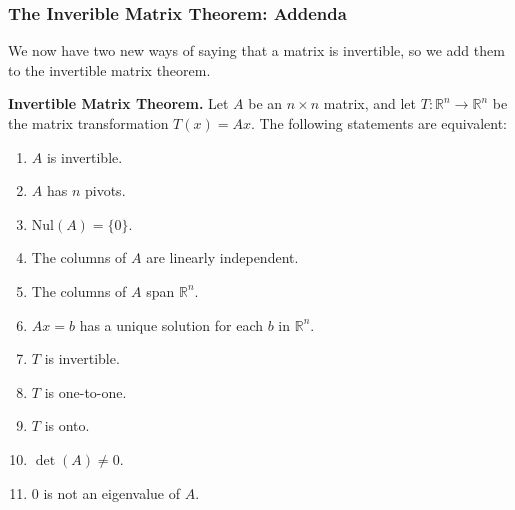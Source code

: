 \documentclass[a4paper,12pt]{article}
\begin{document}
\small \subsubsection{The Inverible Matrix Theorem: Addenda}
\begin{frame}
    \small

    \small We now have two new ways of saying that a matrix is invertible, so we add them to the invertible matrix theorem.

\textbf{Invertible Matrix Theorem.} Let \( A \) be an \( n \times n \) matrix, and let \( T: \mathbb{R}^n \to \mathbb{R}^n \) be the matrix transformation \( T(x) = Ax \). The following statements are equivalent:

\begin{enumerate}
    \item \( A \) is invertible.
    \item \( A \) has \( n \) pivots.
    \item \( \text{Nul}(A) = \{0\} \).
    \item The columns of \( A \) are linearly independent.
    \item The columns of \( A \) span \( \mathbb{R}^n \).
    \item \( Ax = b \) has a unique solution for each \( b \) in \( \mathbb{R}^n \).
    \item \( T \) is invertible.
    \item \( T \) is one-to-one.
    \item \( T \) is onto.
    \item \( \det(A) \neq 0 \).
    \item \( 0 \) is not an eigenvalue of \( A \).
\end{enumerate}
\end{frame}
\end{document}
